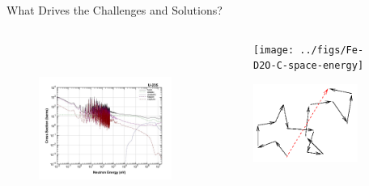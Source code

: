\documentclass[xcolor=x11names,compress]{beamer}
\renewcommand{\(}{\begin{columns}}
\renewcommand{\)}{\end{columns}}
\newcommand{\<}[1]{\begin{column}{#1}}
\renewcommand{\>}{\end{column}}
\begin{document}
\begin{frame}{What Drives the Challenges and Solutions?}
    	
    \begin{columns}
    \begin{column}{0.55\textwidth}     
 	   \begin{center}
 	   \begin{figure}
 	   \includegraphics[height=2.25in,clip]{../figs/u235-xsecs}
       \end{figure}
 	   \end{center}
  	\end{column}
 	\begin{column}{0.4\textwidth}
 	   \begin{center}
 	   \begin{figure}     
 	   \texttt{[image: ../figs/Fe-D2O-C-space-energy]}
 	   \end{figure}
 	   \begin{figure} 
 	   \includegraphics[height=1in,clip]{../figs/random-walk}
       \end{figure}
 	   \end{center}
  	\end{column}
	\end{columns}
	
\end{frame}
\end{document}
